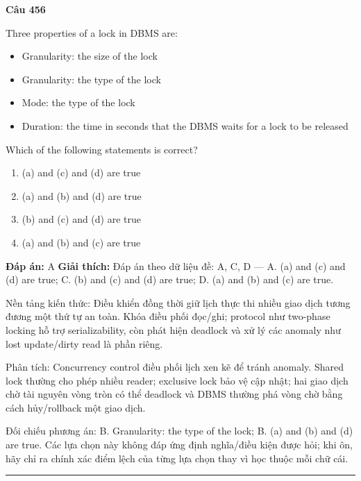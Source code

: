 \documentclass[11pt,a4paper]{article}
\newenvironment{question}[1]{%
  \par\vspace{1em}\noindent\textbf{\large Câu #1}\par\vspace{0.4em}
}{%
  \par\vspace{1em}\hrule\vspace{0.6em}
}
\newenvironment{choices}{%
  \begin{enumerate}[label=\textbf{\Alph*.},leftmargin=2.2em,itemsep=2pt,topsep=3pt]
}{%
  \end{enumerate}
}
\newcommand{\choice}{\item}
\begin{document}
\begin{question}{456}
Three properties of a lock in DBMS are:
\begin{itemize}[label={}, leftmargin=1.5em, itemsep=0.2em]
    \item[(a)] Granularity: the size of the lock
    \item[(b)] Granularity: the type of the lock
    \item[(c)] Mode: the type of the lock
    \item[(d)] Duration: the time in seconds that the DBMS waits for a lock to be released
\end{itemize}
Which of the following statements is correct?
\begin{choices}
\choice (a) and (c) and (d) are true
\choice (a) and (b) and (d) are true
\choice (b) and (c) and (d) are true
\choice (a) and (b) and (c) are true
\end{choices}
\textbf{Đáp án:} A
\textbf{Giải thích:} Đáp án theo dữ liệu đề: A, C, D — A. (a) and (c) and (d) are true; C. (b) and (c) and (d) are true; D. (a) and (b) and (c) are true.

Nền tảng kiến thức: Điều khiển đồng thời giữ lịch thực thi nhiều giao dịch tương đương một thứ tự an toàn. Khóa điều phối đọc/ghi; protocol như two-phase locking hỗ trợ serializability, còn phát hiện deadlock và xử lý các anomaly như lost update/dirty read là phần riêng.

Phân tích: Concurrency control điều phối lịch xen kẽ để tránh anomaly. Shared lock thường cho phép nhiều reader; exclusive lock bảo vệ cập nhật; hai giao dịch chờ tài nguyên vòng tròn có thể deadlock và DBMS thường phá vòng chờ bằng cách hủy/rollback một giao dịch.

Đối chiếu phương án: B. Granularity: the type of the lock; B. (a) and (b) and (d) are true. Các lựa chọn này không đáp ứng định nghĩa/điều kiện được hỏi; khi ôn, hãy chỉ ra chính xác điểm lệch của từng lựa chọn thay vì học thuộc mỗi chữ cái.
\end{question}
\end{document}
